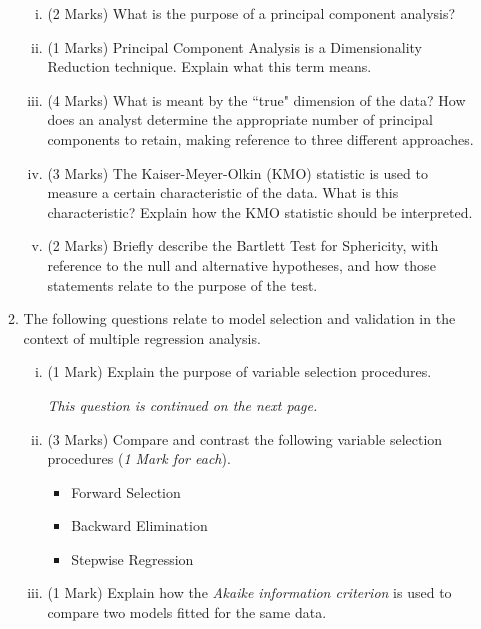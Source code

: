 \documentclass[a4paper,12pt]{article}
\begin{document}
\begin{enumerate}
\begin{enumerate}
\begin{enumerate}[(i)]
	\item (2 Marks)	What is the purpose of a principal component analysis?
	\item (1 Marks) Principal Component Analysis is a Dimensionality Reduction technique. Explain what this term means.
	\item (4 Marks)	What is meant by the ``true" dimension of the data?  How does an analyst determine the appropriate number of principal components to retain, making reference to three different approaches.
	\item (3 Marks) The Kaiser-Meyer-Olkin (KMO) statistic is used to measure a certain characteristic of the data. What is this characteristic? Explain how the KMO statistic should be interpreted.
	\item (2 Marks) Briefly describe the Bartlett Test for Sphericity, with reference to the null and alternative hypotheses, and how those statements relate to the purpose of the test.
\end{enumerate}

\bigskip



\item The following questions relate to model selection and validation in the context of multiple
regression analysis.
\begin{enumerate}[(i)]

	\item (1 Mark) Explain the purpose of variable selection procedures.
	
	\noindent \textit{This question is continued on the next page.}
\newpage
\item (3 Marks) Compare and contrast the following variable selection procedures (\textit{1 Mark for each}).
\begin{itemize}

		\item Forward Selection
		\item Backward Elimination
		\item Stepwise Regression
	\end{itemize}


	\item (1 Mark)  Explain how the \emph{Akaike information criterion} is used to compare two models fitted for the same data.


\end{enumerate}
\end{enumerate}
\end{enumerate}
\end{document}
